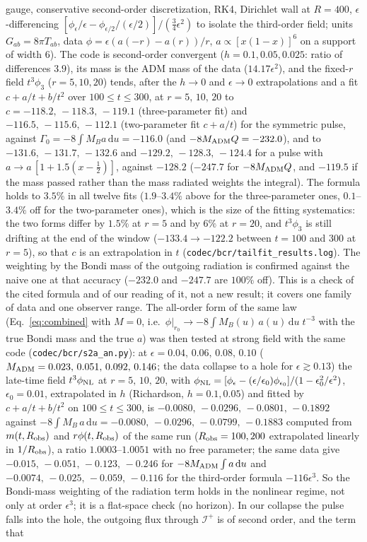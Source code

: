 \documentclass[11pt]{article}
\begin{document}
gauge, conservative second-order discretization, RK4, Dirichlet wall at $R=400$, $\epsilon$-differencing $[\phi_\epsilon/\epsilon-\phi_{\epsilon/2}/(\epsilon/2)]/(\tfrac34\epsilon^{2})$ to isolate the third-order field; units $G_{ab}=8\pi T_{ab}$, data $\phi=\epsilon(a(-r)-a(r))/r$, $a\propto[x(1-x)]^6$ on a support of width $6$). The code is second-order convergent ($h=0.1,0.05,0.025$: ratio of differences $3.9$), its mass is the ADM mass of the data ($14.17\epsilon^2$), and the fixed-$r$ field $t^{3}\phi_3$ ($r=5,10,20$) tends, after the $h\to0$ and $\epsilon\to0$ extrapolations and a fit $c+a/t+b/t^{2}$ over $100\le t\le300$, at $r=5,\,10,\,20$ to $c=-118.2,\,-118.3,\,-119.1$ (three-parameter fit) and $-116.5,\,-115.6,\,-112.1$ (two-parameter fit $c+a/t$) for the symmetric pulse, against $\Gamma_0=-8\int M_B a\,\mathrm du=-116.0$ (and $-8M_{\rm ADM}Q=-232.0$), and to $-131.6,\,-131.7,\,-132.6$ and $-129.2,\,-128.3,\,-124.4$ for a pulse with $a\to a\,[1+1.5(x-\tfrac12)]$, against $-128.2$ ($-247.7$ for $-8M_{\rm ADM}Q$, and $-119.5$ if the mass passed rather than the mass radiated weights the integral). The formula holds to $3.5\%$ in all twelve fits ($1.9$--$3.4\%$ above for the three-parameter ones, $0.1$--$3.4\%$ off for the two-parameter ones), which is the size of the fitting systematics: the two forms differ by $1.5\%$ at $r=5$ and by $6\%$ at $r=20$, and $t^{3}\phi_3$ is still drifting at the end of the window ($-133.4\to-122.2$ between $t=100$ and $300$ at $r=5$), so that $c$ is an extrapolation in $t$ (\texttt{codec/bcr/tailfit\_results.log}). The weighting by the Bondi mass of the outgoing radiation is confirmed against the naive one at that accuracy ($-232.0$ and $-247.7$ are $100\%$ off). This is a check of the cited formula and of our reading of it, not a new result; it covers one family of data and one observer range. The all-order form of the same law (Eq.~\eqref{eq:combined} with $M=0$, i.e.\ $\phi|_{r_0}\to-8\int M_B(u)\,a(u)\,\mathrm du\;t^{-3}$ with the true Bondi mass and the true $a$) was then tested at strong field with the same code (\texttt{codec/bcr/s2a\_an.py}): at $\epsilon=0.04,\,0.06,\,0.08,\,0.10$ ($M_{\rm ADM}=0.023,\,0.051,\,0.092,\,0.146$; the data collapse to a hole for $\epsilon\gtrsim0.13$) the late-time field $t^{3}\phi_{\rm NL}$ at $r=5,\,10,\,20$, with $\phi_{\rm NL}=[\phi_\epsilon-(\epsilon/\epsilon_0)\phi_{\epsilon_0}]/(1-\epsilon_0^{2}/\epsilon^{2})$, $\epsilon_0=0.01$, extrapolated in $h$ (Richardson, $h=0.1,0.05$) and fitted by $c+a/t+b/t^{2}$ on $100\le t\le300$, is $-0.0080,\,-0.0296,\,-0.0801,\,-0.1892$ against $-8\int M_B\,a\,\mathrm du=-0.0080,\,-0.0296,\,-0.0799,\,-0.1883$ computed from $m(t,R_{\rm obs})$ and $r\phi(t,R_{\rm obs})$ of the same run ($R_{\rm obs}=100,200$ extrapolated linearly in $1/R_{\rm obs}$), a ratio $1.0003$--$1.0051$ with no free parameter; the same data give $-0.015,\,-0.051,\,-0.123,\,-0.246$ for $-8M_{\rm ADM}\int a\,\mathrm du$ and $-0.0074,\,-0.025,\,-0.059,\,-0.116$ for the third-order formula $-116\epsilon^{3}$. So the Bondi-mass weighting of the radiation term holds in the nonlinear regime, not only at order $\epsilon^{3}$; it is a flat-space check (no horizon).  In our collapse the pulse falls into the hole, the outgoing flux through $\mathcal I^{+}$ is of second order, and the term that 
\end{document}
